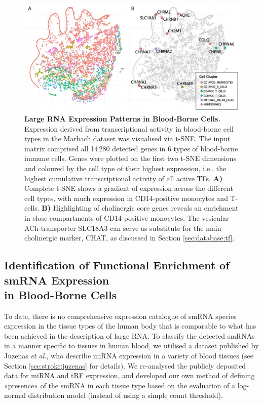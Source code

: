\begin{figure}
\includegraphics[width=\textwidth]{figures/tsne-large}
\caption[Large RNA Expression Patterns in Blood-Borne Cells.]{\textbf{Large RNA Expression Patterns in Blood-Borne Cells.} Expression derived from transcriptional activity in blood-borne cell types in the Marbach dataset\cite{Marbach2016} was visualised via t-SNE. The input matrix comprised all 14\,280 detected genes in 6 types of blood-borne immune cells. Genes were plotted on the first two t-SNE dimensions and coloured by the cell type of their highest expression, i.e., the highest cumulative transcriptional activity of all active TFs. \textbf{A)} Complete t-SNE shows a gradient of expression across the different cell types, with much expression in CD14-positive monocytes and T-cells. \textbf{B)} Highlighting of cholinergic core genes reveals an enrichment in close compartments of CD14-positive monocytes. The vesicular ACh-transporter SLC18A3 can serve as substitute for the main cholinergic marker, CHAT, as discussed in Section \ref{sec:database:tf}.
\label{fig:tsne-large}}
\end{figure}

\subsection{Identification of Functional Enrichment of smRNA Expression\\ in Blood-Borne Cells}
To date, there is no comprehensive expression catalogue of smRNA species expression in the tissue types of the human body that is comparable to what has been achieved in the description of large RNA. To classify the detected smRNAs in a manner specific to tissues in human blood, we utilised a dataset published by Juzenas \emph{et al.},\cite{Juzenas2017} who describe miRNA expression in a variety of blood tissues (see Section \ref{sec:stroke:juzenas} for details). We re-analysed the publicly deposited data for miRNA and tRF expression, and developed our own method of defining »presence« of the smRNA in each tissue type based on the evaluation of a log-normal distribution model (instead of using a simple count threshold). 

